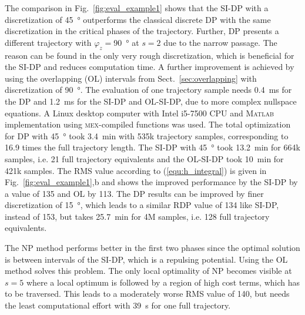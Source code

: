 \documentclass[runningheads]{llncs}
\begin{document}
The comparison in Fig.~\ref{fig:eval_example1} shows that the SI-DP with a discretization of \SI{45}{\degree} outperforms the classical discrete DP with the same discretization in the critical phases of the trajectory.
Further, DP presents a different trajectory with $\varphi_z{=}$\SI{90}{\degree} at $s{=}2$ due to the narrow passage.
The reason can be found in the only very rough discretization, which is beneficial for the SI-DP and reduces computation time.
A further improvement is achieved by using the overlapping (OL) intervals from Sect.~\ref{sec:overlapping} with discretization of \SI{90}{\degree}.
The evaluation of one trajectory sample needs \SI{0.4}{\milli\second} for the DP and \SI{1.2}{\milli\second} for the SI-DP and OL-SI-DP, due to more complex nullspace equations.
A Linux desktop computer with Intel i5-7500 CPU and \textsc{Matlab} implementation using \textsc{mex}-compiled functions was used.
The total optimization for DP with \SI{45}{\degree} took \SI{3.4}{\minute} with 535k trajectory samples, corresponding to 16.9 times the full trajectory length.
The SI-DP with \SI{45}{\degree} took \SI{13.2}{\minute} for 664k samples, i.e. 21 full trajectory equivalents and the OL-SI-DP took \SI{10}{\minute} for 421k samples.
The RMS value according to (\ref{equ:h_integral}) is given in Fig.~\ref{fig:eval_example1},b and shows the improved performance by the SI-DP by a value of 135 and OL by 113.
The DP results can be improved by finer discretization of \SI{15}{\degree}, which leads to a similar RDP value of 134 like SI-DP, instead of 153, but takes \SI{25.7}{\minute} for 4M samples, i.e. 128 full trajectory equivalents.

The NP method performs better in the first two phases since the optimal solution is between intervals of the SI-DP, which is a repulsing potential.
Using the OL method solves this problem.
The only local optimality of NP becomes visible at $s{=}5$ where a local optimum is followed by a region of high cost terms, which has to be traversed.
This leads to a moderately worse RMS value of 140, but needs the least computational effort with \SI{39}{\second} for one full trajectory.
\end{document}
